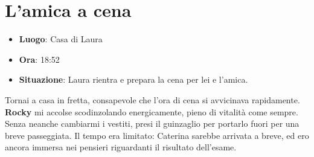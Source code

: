 \newpage

\section{L'amica a cena}

\begin{tcolorbox}[colback=gray!5,colframe=gray!80,title=\textbf{Scheda Informativa}]
\begin{itemize}
    \item \textbf{Luogo}: Casa di Laura
    \item \textbf{Ora}: 18:52
    \item \textbf{Situazione}: Laura rientra e prepara la cena per lei e l'amica.
\end{itemize}
\end{tcolorbox}

\begin{center}
\begin{minipage}{0.7\textwidth}
    \centering
    
\end{minipage}
\end{center}


Tornai a casa in fretta, consapevole che l'ora di cena si avvicinava rapidamente. \textbf{Rocky} mi accolse scodinzolando energicamente, pieno di vitalità come sempre. Senza neanche cambiarmi i vestiti, presi il guinzaglio per portarlo fuori per una breve passeggiata. Il tempo era limitato: Caterina sarebbe arrivata a breve, ed ero ancora immersa nei pensieri riguardanti il risultato dell'esame.

